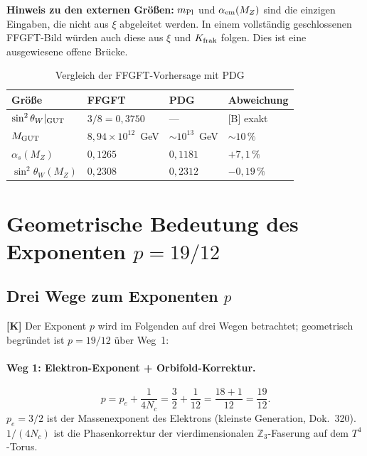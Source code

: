 \textbf{Hinweis zu den externen Größen:} $m_{\rm Pl}$ und
$\alpha_{\rm em}(M_Z)$ sind die einzigen Eingaben, die nicht aus
$\xi$ abgeleitet werden. In einem vollständig geschlossenen FFGFT-Bild
würden auch diese aus $\xi$ und $K_{\rm frak}$ folgen. Dies ist eine
ausgewiesene offene Brücke.

\begin{table}[h]
\centering
\caption{Vergleich der FFGFT-Vorhersage mit PDG}
\label{tab:vergleich}
\begin{tabular}{llll}
\toprule
Größe & FFGFT & PDG & Abweichung \\
\midrule
$\sin^2\theta_W|_{\rm GUT}$ & $3/8 = 0{,}3750$ & --- & [B] exakt \\
$M_{\rm GUT}$ & $8{,}94\times10^{12}$~GeV & $\sim10^{13}$~GeV & $\sim10\,\%$ \\
$\alpha_s(M_Z)$ & $0{,}1265$ & $0{,}1181$ & $+7{,}1\,\%$ \\
$\sin^2\theta_W(M_Z)$ & $0{,}2308$ & $0{,}2312$ & $-0{,}19\,\%$ \\
\bottomrule
\end{tabular}
\end{table}

\section{Geometrische Bedeutung des Exponenten $p = 19/12$}

\subsection{Drei Wege zum Exponenten $p$}

\textbf{[K]} Der Exponent $p$ wird im Folgenden auf drei Wegen
betrachtet; geometrisch begründet ist $p = 19/12$ über Weg~1:

\paragraph{Weg 1: Elektron-Exponent + Orbifold-Korrektur.}
\begin{equation}
  p = p_e + \frac{1}{4N_c}
    = \frac{3}{2} + \frac{1}{12}
    = \frac{18+1}{12} = \frac{19}{12}.
  \label{eq:p_weg1}
\end{equation}
$p_e = 3/2$ ist der Massenexponent des Elektrons (kleinste Generation,
Dok.~320). $1/(4N_c)$ ist die Phasenkorrektur der vierdimensionalen
$\mathbb{Z}_3$-Faserung auf dem $T^4$-Torus.

